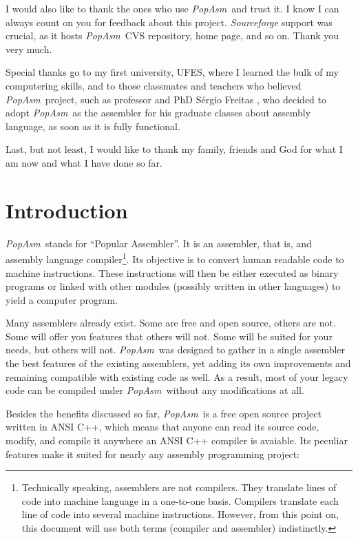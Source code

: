 \documentclass[a4paper,12pt]{book}
\newcommand{\popasm}{\emph{PopAsm}}
\begin{document}
I would also like to thank the ones who use \popasm\ and trust it.
I know I can always count on you for
feedback about this project. \emph{Sourceforge} support was crucial, as
it hosts \popasm\ CVS repository,
home page, and so on. Thank you very much.

Special thanks go to my first university, UFES\cite{UFES}, where I
learned the bulk of my computering skills, and
to those classmates and teachers who believed \popasm\ project,
such as professor and PhD S\'ergio Freitas%
\cite{FREITAS}, who decided to adopt \popasm\ as the assembler for
his graduate classes about assembly language, as soon as it is
fully functional.

Last, but not least, I would like to thank my family, friends and God
for what I am now and what I have done so far.

\tableofcontents
\newpage
\listoftables
\newpage

\chapter{Introduction}
\popasm\ stands for ``Popular Assembler''. It is an assembler,
that is, and assembly language compiler\footnote{Technically
speaking, assemblers are not compilers. They translate lines of code
into machine language in a one-to-one basis. Compilers
translate each line of code into several machine instructions. However,
from this point on, this document will use both
terms (compiler and assembler) indistinctly.}. Its objective is to
convert human readable code to machine instructions.
These instructions will then be either executed as binary programs or
linked with other modules (possibly written in
other languages) to yield a computer program.

Many assemblers already exist. Some are free and open source, others
are not. Some will offer you features that others
will not. Some will be suited for your needs, but others will not.
\popasm\ was designed to gather in a single
assembler the best features of the existing assemblers, yet adding its
own improvements and remaining compatible with
existing code as well. As a result, most of your legacy code can be
compiled under \popasm\ without any modifications
at all.

Besides the benefits discussed so far, \popasm\ is a free open
source project written in ANSI C++, which means
that anyone can read its source code, modify, and compile it anywhere
an ANSI C++ compiler is avaiable. Its peculiar
features make it suited for nearly any assembly programming project:
\end{document}
